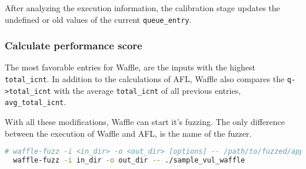 After analyzing the execution information, the calibration stage updates the undefined or old values of the current \texttt{queue\_entry}.

\subsubsection*{Calculate performance score}

The most favorable entries for Waffle, are the inputs with the highest \texttt{total\_icnt}. In addition to the calculations of AFL, Waffle also compares the \texttt{q->total\_icnt} with the average \texttt{total\_icnt} of all previous entries, \texttt{avg\_total\_icnt}.



With all these modifications, Waffle can start it's fuzzing. The only difference between the execution of Waffle and AFL, is the name of the fuzzer.

\begin{lstlisting}[language=bash,style=CommandStyle,caption=Execute AFL]
  # waffle-fuzz -i <in_dir> -o <out_dir> [options] -- /path/to/fuzzed/app [params]
  waffle-fuzz -i in_dir -o out_dir -- ./sample_vul_waffle
\end{lstlisting}
